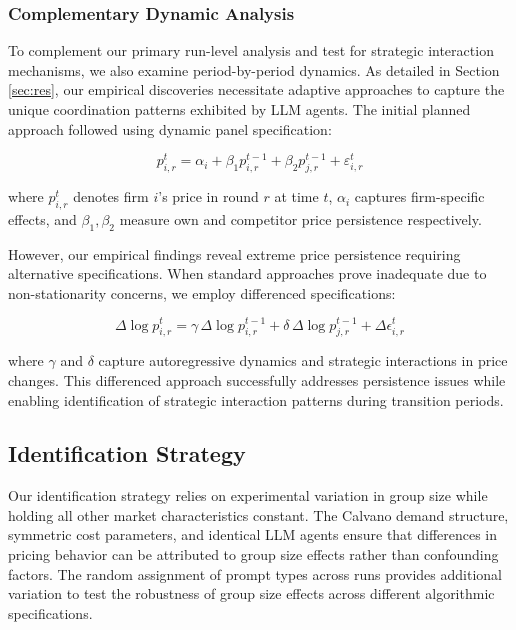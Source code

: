 \subsubsection*{Complementary Dynamic Analysis}

To complement our primary run-level analysis and test for strategic interaction mechanisms, we also examine period-by-period dynamics. As detailed in Section \ref{sec:res}, our empirical discoveries necessitate adaptive approaches to capture the unique coordination patterns exhibited by LLM agents. The initial planned approach followed \textcite{fish_algorithmic_2025} using dynamic panel specification:

\begin{equation}\label{eq:dynamic_panel}
    p_{i,r}^t = \alpha_i + \beta_1 p_{i,r}^{t-1} + \beta_2 p_{j,r}^{t-1} + \varepsilon_{i,r}^t
\end{equation}

where $p_{i,r}^t$ denotes firm $i$'s price in round $r$ at time $t$, $\alpha_i$ captures firm-specific effects, and $\beta_1, \beta_2$ measure own and competitor price persistence respectively.

However, our empirical findings reveal extreme price persistence requiring alternative specifications. When standard approaches prove inadequate due to non-stationarity concerns, we employ differenced specifications:

\begin{equation}\label{eq:differenced_fe}
    \Delta \log p_{i,r}^{t} = \gamma \, \Delta \log p_{i,r}^{t-1} + \delta \, \Delta \log p_{j,r}^{t-1} + \Delta \epsilon_{i,r}^t
\end{equation}

where $\gamma$ and $\delta$ capture autoregressive dynamics and strategic interactions in price changes. This differenced approach successfully addresses persistence issues while enabling identification of strategic interaction patterns during transition periods.

\subsection{Identification Strategy}

Our identification strategy relies on experimental variation in group size while holding all other market characteristics constant. The Calvano demand structure, symmetric cost parameters, and identical LLM agents ensure that differences in pricing behavior can be attributed to group size effects rather than confounding factors. The random assignment of prompt types across runs provides additional variation to test the robustness of group size effects across different algorithmic specifications.

